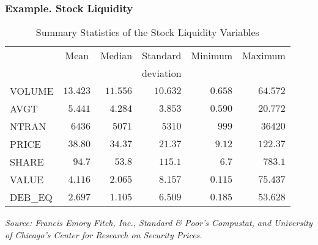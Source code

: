 \begin{frame}%
 \frametitle{Example. Stock Liquidity}
\begin{table}[h]

\caption{ Summary Statistics of the Stock Liquidity Variables}

\begin{tabular}{cccccc}
\hline
& Mean & Median & Standard & Minimum & Maximum \\
&  &  & deviation &  &  \\ \hline \multicolumn{1}{l}{VOLUME} &
\multicolumn{1}{r}{$13.423$} & \multicolumn{1}{r}{$11.556$} &
\multicolumn{1}{r}{$10.632$} &
\multicolumn{1}{r}{$0.658$} & \multicolumn{1}{r}{$64.572$} \\
\multicolumn{1}{l}{AVGT} & \multicolumn{1}{r}{$5.441$} & \multicolumn{1}{r}{$%
4.284$} & \multicolumn{1}{r}{$3.853$} & \multicolumn{1}{r}{$0.590$}
&
\multicolumn{1}{r}{$20.772$} \\
\multicolumn{1}{l}{NTRAN} & \multicolumn{1}{r}{$6436$} & \multicolumn{1}{r}{$%
5071$} & \multicolumn{1}{r}{$5310$} & \multicolumn{1}{r}{$999$} &
\multicolumn{1}{r}{$36420$} \\
\multicolumn{1}{l}{PRICE} & \multicolumn{1}{r}{$38.80$} & \multicolumn{1}{r}{%
$34.37$} & \multicolumn{1}{r}{$21.37$} & \multicolumn{1}{r}{$9.12$}
&
\multicolumn{1}{r}{$122.37$} \\
\multicolumn{1}{l}{SHARE} & \multicolumn{1}{r}{$94.7$} & \multicolumn{1}{r}{$%
53.8$} & \multicolumn{1}{r}{$115.1$} & \multicolumn{1}{r}{$6.7$} &
\multicolumn{1}{r}{$783.1$} \\
\multicolumn{1}{l}{VALUE} & \multicolumn{1}{r}{$4.116$} & \multicolumn{1}{r}{%
$2.065$} & \multicolumn{1}{r}{$8.157$} & \multicolumn{1}{r}{$0.115$}
&
\multicolumn{1}{r}{$75.437$} \\
\multicolumn{1}{l}{DEB\_EQ} & \multicolumn{1}{r}{$2.697$} &
\multicolumn{1}{r}{$1.105$} & \multicolumn{1}{r}{$6.509$} &
\multicolumn{1}{r}{$0.185$} & \multicolumn{1}{r}{$53.628$} \\ \hline
\end{tabular}

\textit{Source: Francis Emory Fitch, Inc., Standard \& Poor's
Compustat, and University of Chicago's Center for Research on
Security Prices.}

\end{table}
\end{frame}

